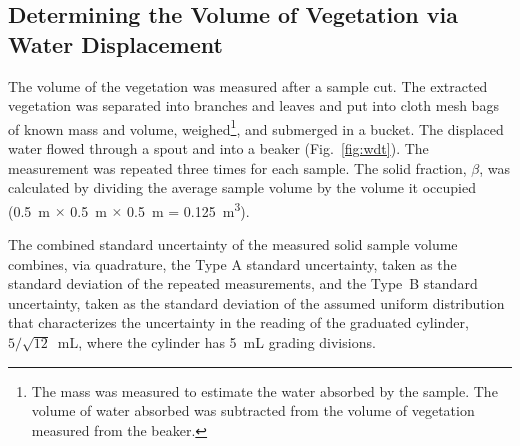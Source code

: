 \documentclass[12pt]{article}
\begin{document}
\subsection{Determining the Volume of Vegetation via Water Displacement}
\label{ssec:waterdisp}

The volume of the vegetation was measured after a sample cut. The extracted vegetation was separated into branches and leaves and put into cloth mesh bags of known mass and volume, weighed\footnote{The mass was measured to estimate the water absorbed by the sample. The volume of water absorbed was subtracted from the volume of vegetation measured from the beaker.}, and submerged in a bucket. The displaced water flowed through a spout and into a beaker (Fig.~\ref{fig:wdt}). The measurement was repeated three times for each sample. The solid fraction, $\beta$, was calculated by dividing the average sample volume by the volume it occupied (0.5~\si{m} $\times$ 0.5~\si{m} $\times$ 0.5~\si{m} = 0.125~\si{m^{3}}). 

The combined standard uncertainty of the measured solid sample volume combines, via quadrature, the Type A standard uncertainty, taken as the standard deviation of the repeated measurements, and the Type~B standard uncertainty, taken as the standard deviation of the assumed uniform distribution that characterizes the uncertainty in the reading of the graduated cylinder, $5/\sqrt{12}$~mL, where the cylinder has 5~mL grading divisions.
\end{document}
